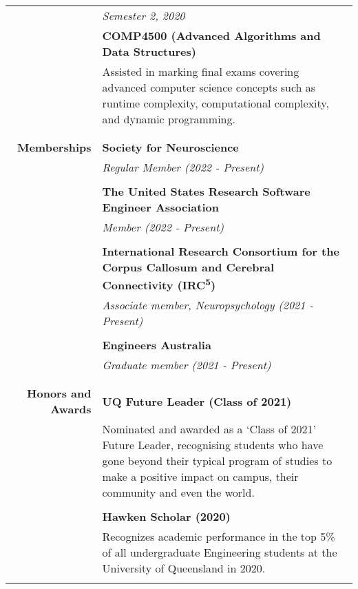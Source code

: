 \documentclass{article}
\begin{document}
\begin{longtable}{r | p{13cm}}
											& \textit{Semester 2, 2020} \\
											& \textbf{COMP4500 (Advanced Algorithms and Data Structures)} \\
											& Assisted in marking final exams covering advanced computer science concepts such as runtime complexity, computational complexity, and dynamic programming. \\
											& \\
											\hline

											\pagebreak

											\hline \\

		\large\textbf{Memberships} 	  		& \large\textbf{Society for Neuroscience} \\
											& \textit{Regular Member (2022 - Present)} \\
											& \\
		
											& \large\textbf{The United States Research Software Engineer Association} \\
											& \textit{Member (2022 - Present)} \\
											& \\
		
											& \large\textbf{International Research Consortium for the Corpus Callosum and Cerebral Connectivity (IRC\textsuperscript{5})} \\
											& \textit{Associate member, Neuropsychology (2021 - Present)} \\ 
											& \\

											& \large\textbf{Engineers Australia} \\
											& \textit{Graduate member (2021 - Present)} \\
											& \\
											\hline \\

		\large\textbf{Honors and Awards}	& \large\textbf{UQ Future Leader (Class of 2021)} \\
											& Nominated and awarded as a `Class of 2021' Future Leader, recognising students who have gone beyond their typical program of studies to make a positive impact on campus, their community and even the world.  \\
											& \\

											& \large\textbf{Hawken Scholar (2020)} \\
											& Recognizes academic performance in the top 5\% of all undergraduate Engineering students at the University of Queensland in 2020. \\
											& \\
											

\end{longtable}
\end{document}
